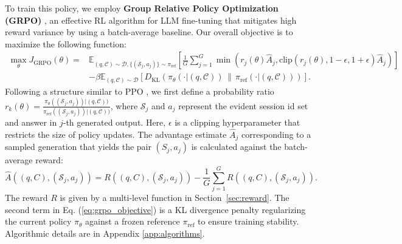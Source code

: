 \documentclass{article} %
\begin{document}
To train this policy, we employ \textbf{Group Relative Policy Optimization (GRPO)} \citep{zheng2025group}, an effective RL algorithm for LLM fine-tuning that mitigates high reward variance by using a batch-average baseline. Our overall objective is to maximize the following function:
\begin{equation}
\begin{split}
\max_{\theta} J_{\text{GRPO}}(\theta) ={}& \mathbb{E}_{(q,\mathcal{C})\sim\mathcal{D}, \{(\mathcal{S}_j, a_j)\}\sim\pi_{\text{ref}}} \left[ \frac{1}{G}\sum_{j=1}^{G} \min\left(r_j(\theta)\hat{A}_j, \text{clip}(r_j(\theta), 1-\epsilon, 1+\epsilon)\hat{A}_j\right) \right] \\
& - \beta \mathbb{E}_{(q,\mathcal{C})\sim\mathcal{D}} \left[ D_{\text{KL}}\left(\pi_\theta(\cdot|(q,\mathcal{C})) \,\|\, \pi_{\text{ref}}(\cdot|(q,\mathcal{C}))\right) \right].
\end{split}
\label{eq:grpo_objective}
\end{equation}
Following a structure similar to PPO \citep{schulman2017proximal}, we first define a probability ratio $r_k(\theta) = \frac{\pi_\theta((\mathcal{S}_j, a_j)) | (q, \mathcal{C}))}{\pi_{\text{ref}}((\mathcal{S}_j, a_j)) | (q, \mathcal{C}))}$, where $\mathcal{S}_j$ and $a_j$ represent the evident session id set and answer in $j$-th generated output. Here, $\epsilon$ is a clipping hyperparameter that restricts the size of policy updates. The advantage estimate $\hat{A}_j$ corresponding to a sampled generation that yields the pair $(S_j,a_j)$ is calculated against the batch-average reward:
\begin{equation}
\hat{A}((q,C), (\mathcal{S}_j, a_j)) = R((q,C), (\mathcal{S}_j, a_j)) - \frac{1}{G}\sum_{j=1}^{G}R((q,C), (\mathcal{S}_j, a_j)).
 \label{eq:advantage}
\end{equation}
The reward $R$ is given by a multi-level function in Section~\ref{sec:reward}. The second term in Eq. (\ref{eq:grpo_objective}) is a KL divergence penalty regularizing the current policy $\pi_\theta$ against a frozen reference $\pi_{\text{ref}}$ to ensure training stability. Algorithmic details are in Appendix \ref{app:algorithms}.
\end{document}
